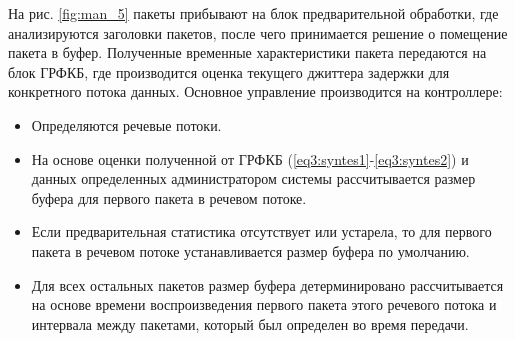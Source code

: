 На рис. \ref{fig:man_5} пакеты прибывают на блок предварительной обработки, где анализируются заголовки пакетов, после чего принимается решение о помещение пакета в буфер.
Полученные временные характеристики пакета передаются на блок ГРФКБ, где производится оценка текущего джиттера задержки для конкретного потока данных.
Основное управление производится на контроллере: 
\begin{itemize}
 \item Определяются речевые потоки.
 \item На основе оценки полученной от ГРФКБ (\ref{eq3:syntes1}-\ref{eq3:syntes2}) и данных определенных администратором системы рассчитывается размер буфера для первого пакета в речевом потоке.
 \item Если предварительная статистика отсутствует или устарела, то для первого пакета в речевом потоке устанавливается размер буфера по умолчанию.
 \item Для всех остальных пакетов размер буфера детерминировано рассчитывается на основе времени воспроизведения первого пакета этого речевого потока и интервала между пакетами, который был определен во время передачи.
\end{itemize}


